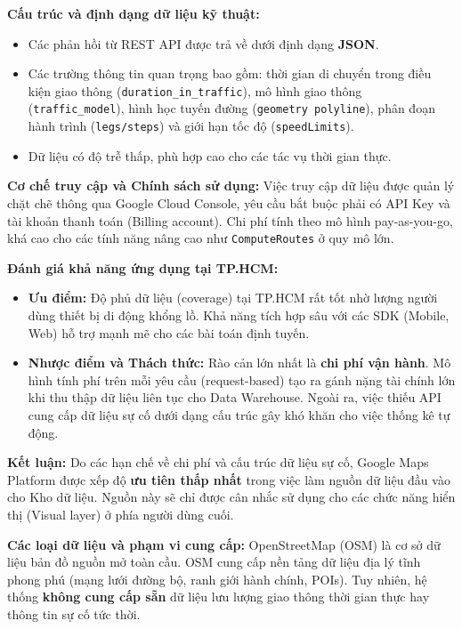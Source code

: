 \textbf{Cấu trúc và định dạng dữ liệu kỹ thuật:}
\begin{itemize}
    \item Các phản hồi từ REST API được trả về dưới định dạng \textbf{JSON}.
    \item Các trường thông tin quan trọng bao gồm: thời gian di chuyển trong điều kiện giao thông (\texttt{duration\_in\_traffic}), mô hình giao thông (\texttt{traffic\_model}), hình học tuyến đường (\texttt{geometry polyline}), phân đoạn hành trình (\texttt{legs/steps}) và giới hạn tốc độ (\texttt{speedLimits}).
    \item Dữ liệu có độ trễ thấp, phù hợp cao cho các tác vụ thời gian thực.
\end{itemize}

\textbf{Cơ chế truy cập và Chính sách sử dụng:} Việc truy cập dữ liệu được quản lý chặt chẽ thông qua Google Cloud Console, yêu cầu bắt buộc phải có API Key và tài khoản thanh toán (Billing account). Chi phí tính theo mô hình pay-as-you-go, khá cao cho các tính năng nâng cao như \texttt{ComputeRoutes} ở quy mô lớn.

\textbf{Đánh giá khả năng ứng dụng tại TP.HCM:}
\begin{itemize}
    \item \textbf{Ưu điểm:} Độ phủ dữ liệu (coverage) tại TP.HCM rất tốt nhờ lượng người dùng thiết bị di động khổng lồ. Khả năng tích hợp sâu với các SDK (Mobile, Web) hỗ trợ mạnh mẽ cho các bài toán định tuyến.
    \item \textbf{Nhược điểm và Thách thức:} Rào cản lớn nhất là \textbf{chi phí vận hành}. Mô hình tính phí trên mỗi yêu cầu (request-based) tạo ra gánh nặng tài chính lớn khi thu thập dữ liệu liên tục cho Data Warehouse. Ngoài ra, việc thiếu API cung cấp dữ liệu sự cố dưới dạng cấu trúc gây khó khăn cho việc thống kê tự động.
\end{itemize}

\textbf{Kết luận:} Do các hạn chế về chi phí và cấu trúc dữ liệu sự cố, Google Maps Platform được xếp độ \textbf{ưu tiên thấp nhất} trong việc làm nguồn dữ liệu đầu vào cho Kho dữ liệu. Nguồn này sẽ chỉ được cân nhắc sử dụng cho các chức năng hiển thị (Visual layer) ở phía người dùng cuối.


\textbf{Các loại dữ liệu và phạm vi cung cấp:} OpenStreetMap (OSM) là cơ sở dữ liệu bản đồ nguồn mở toàn cầu. OSM cung cấp nền tảng dữ liệu địa lý tĩnh phong phú (mạng lưới đường bộ, ranh giới hành chính, POIs). Tuy nhiên, hệ thống \textbf{không cung cấp sẵn} dữ liệu lưu lượng giao thông thời gian thực hay thông tin sự cố tức thời.

